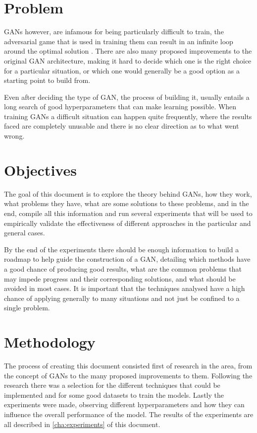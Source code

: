 \section{Problem}
\acp{GAN} however, are infamous for being particularly difficult to train, the adversarial game that is used in training them can result in an infinite loop around the optimal solution \cite{wasserstein2017}. There are also many proposed improvements to the original \gls{GAN} architecture, making it hard to decide which one is the right choice for a particular situation, or which one would generally be a good option as a starting point to build from.

Even after deciding the type of \gls{GAN}, the process of building it, usually entails a long search of good hyperparameters that can make learning possible. When training \acp{GAN} a difficult situation can happen quite frequently, where the results faced are completely unusable and there is no clear direction as to what went wrong.

\section{Objectives}
The goal of this document is to explore the theory behind \acp{GAN}, how they work, what problems they have, what are some solutions to these problems, and in the end, compile all this information and run several experiments that will be used to empirically validate the effectiveness of different approaches in the particular and general cases.

By the end of the experiments there should be enough information to build a roadmap to help guide the construction of a \gls{GAN}, detailing which methods have a good chance of producing good results, what are the common problems that may impede progress and their corresponding solutions, and what should be avoided in most cases. It is important that the techniques analysed have a high chance of applying generally to many situations and not just be confined to a single problem.

\section{Methodology}
The process of creating this document consisted first of research in the area, from the concept of \acp{GAN} to the many proposed improvements to them. Following the research there was a selection for the different techniques that could be implemented and for some good datasets to train the models. Lastly the experiments were made, observing different hyperparameters and how they can influence the overall performance of the model. The results of the experiments are all described in \autoref{cha:experiments} of this document.

